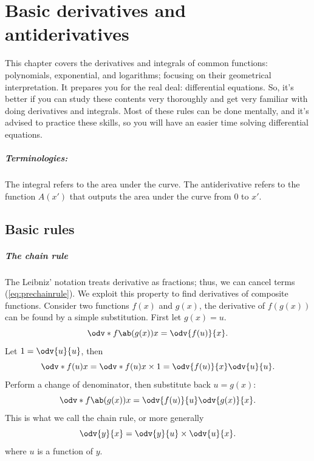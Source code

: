 \chapter{Basic derivatives and antiderivatives}
\label{sec:basic-derivatives-and-integrals}

This chapter covers the derivatives and integrals of common functions: polynomials, exponential, and logarithms; focusing on their geometrical interpretation. It prepares you for the real deal:  differential equations. So, it's better if you can study these contents very thoroughly and get very familiar with doing derivatives and integrals. Most of these rules can be done mentally, and it's advised to practice these skills, so you will have an easier time solving differential equations.


\paragraph{Terminologies:} The integral refers to the area under the curve. The antiderivative refers to the function $A(x')$ that outputs the area under the curve from $0$ to $x'$.

\section{Basic rules}
\label{sec:trivial_rules}

\paragraph{The chain rule} The Leibniz' notation treats derivative as fractions; thus, we can cancel terms (\cref{eq:prechainrule}). We exploit this property to find derivatives of composite functions. Consider two functions $f(x)$ and $g(x)$, the derivative of $f(g(x))$ can be found by a simple substitution. First let $g(x) = u$.
\begin{equation*}
	\odv*{f\ab(g(x))}{x} = \odv{f(u)}{x}.
\end{equation*}
Let $1 = \odv{u}{u}$, then
\begin{equation*}
	\odv*{f(u)}{x} = \odv*{f(u)}{x} \times 1 = \odv{f(u)}{x} \odv{u}{u}.
\end{equation*}
Perform a change of denominator, then substitute back $u = g(x)$:
\begin{equation*}
	\odv*{f\ab(g(x))}{x} = \odv{f(u)}{u}\odv{g(x)}{x}.
\end{equation*}
This is what we call the chain rule, or more generally
\begin{equation}
	\odv{y}{x} = \odv{y}{u} \times \odv{u}{x}. \label{eq:chainrule}
\end{equation}
where $u$ is a function of $y$.

